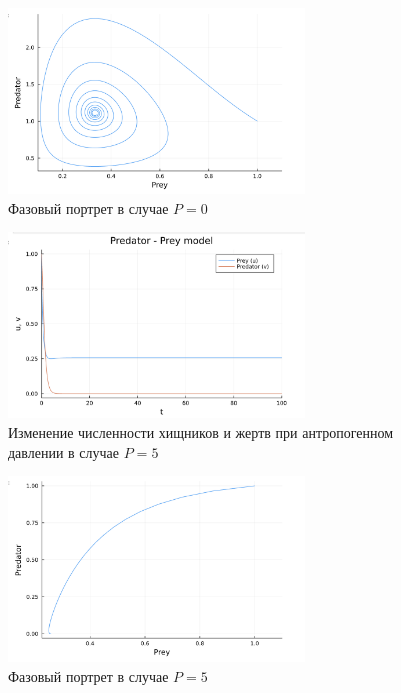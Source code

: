 \documentclass[
  13pt,
  fontsize=13pt,
  russian,
  a4paper,
,captions=tableheading
]{scrreprt}
\begin{document}
\begin{figure}
\hypertarget{fig:2}{%
\centering
\includegraphics[width=0.7\textwidth,height=\textheight]{2.png}
\caption{Фазовый портрет в случае \(P=0\)}\label{fig:2}
}
\end{figure}

\begin{figure}
\hypertarget{fig:3}{%
\centering
\includegraphics[width=0.7\textwidth,height=\textheight]{3.png}
\caption{Изменение численности хищников и жертв при антропогенном
давлении в случае \(P=5\)}\label{fig:3}
}
\end{figure}

\begin{figure}
\hypertarget{fig:4}{%
\centering
\includegraphics[width=0.7\textwidth,height=\textheight]{4.png}
\caption{Фазовый портрет в случае \(P=5\)}\label{fig:4}
}
\end{figure}
\end{document}
